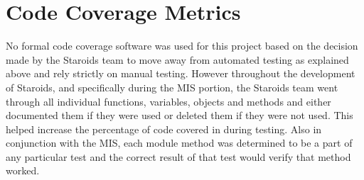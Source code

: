 \documentclass[12pt, titlepage]{article}
\begin{document}
\section{Code Coverage Metrics}
No formal code coverage software was used for this project based on the decision made by the Staroids team to move away from automated testing as explained above and rely strictly on manual testing. However throughout the development of Staroids, and specifically during the MIS portion, the Staroids team went through all individual functions, variables, objects and methods and either documented them if they were used or deleted them if they were not used. This helped increase the percentage of code covered in during testing. Also in conjunction with the MIS, each module method was determined to be a part of any particular test and the correct result of that test would verify that method worked.




\end{document}
